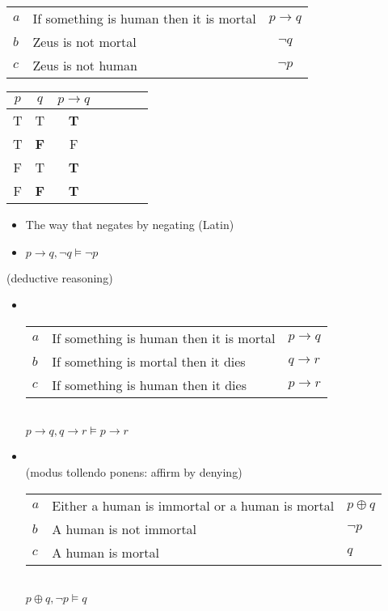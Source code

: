 \documentclass[headrule,footrule]{foils}
\begin{document}
\begin{center}
  \begin{tabular}{llc}
    $a$ & If something is human then it is mortal & $p  \rightarrow q$\\
    $b$ & Zeus is not mortal  & $\neg q$ \\ \hline
    $c$ & Zeus is not human   & $\neg p$
  \end{tabular}

  \begin{tabular}{|c|c|c|c|c|c|c|}
    \hline
    $p$ & $q$ & $p \rightarrow q$  \\
    \hline
    T & T & \textbf{T}  \\ 
    T & \textbf{F} & F  \\ 
    F & T & \textbf{T}  \\ 
    \rowcolor{Gray}
    F & \textbf{F} & \textbf{T}  \\ 
    \hline
  \end{tabular}
\end{center}
\begin{itemize}
\item  The way that negates by negating (Latin)
\item $p \rightarrow q, \neg q \models \neg p$
\end{itemize}

(deductive reasoning)
\begin{itemize}
\item {}
\\[2ex]
 \begin{tabular}{lll}
    $a$ & If something is human then it is mortal &  $p \rightarrow q$ \\
    $b$ & If something is mortal then it dies & $q \rightarrow r$ \\ \hline
    $c$ & If something is human then it dies &  $p \rightarrow r$
  \end{tabular}
\\ $p \rightarrow q, q \rightarrow r \models p \rightarrow r$

\item {}
\\ (modus tollendo ponens: affirm by denying)
\\[2ex]
 \begin{tabular}{lll}
    $a$ & Either a human is immortal or a human is mortal & $p \oplus q$ \\
    $b$ & A human is not immortal  & $ \neg p $ \\ \hline
    $c$ & A human is mortal & $q$
  \end{tabular}
\\ $p \oplus q, \neg p \models q$
\end{itemize}
\end{document}
